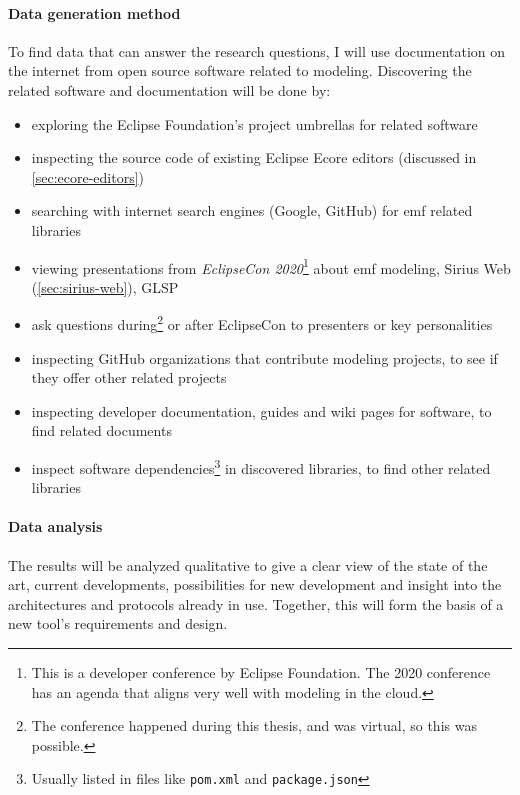 \paragraph*{Data generation method}
To find data that can answer the research questions, I will use documentation on the internet from \gls{open source} software related to modeling.
Discovering the related software and documentation will be done by:
\begin{itemize}
  \item exploring the Eclipse Foundation's project umbrellas for related software
  \item inspecting the source code of existing \gls{Eclipse} \gls{Ecore} editors (discussed in \cref{sec:ecore-editors})
  \item searching with internet search engines (Google, GitHub) for \gls{emf} related libraries
  \item viewing presentations from \emph{EclipseCon 2020}\footnote{This is a developer conference by Eclipse Foundation. The 2020 conference has an agenda that aligns very well with modeling in the \gls{cloud}.} about \gls{emf} modeling, Sirius Web (\cref{sec:sirius-web}), \acrshort{GLSP}
  \item ask questions during\footnote{The conference happened during this thesis, and was virtual, so this was possible.} or after EclipseCon to presenters or key personalities 
  \item inspecting GitHub organizations that contribute modeling projects, to see if they offer other related projects
  \item inspecting developer documentation, guides and wiki pages for software, to find related documents
  \item inspect software dependencies\footnote{Usually listed in files like \texttt{pom.xml} and \texttt{package.json}} in discovered libraries, to find other related libraries 
\end{itemize}

\paragraph*{Data analysis}
The results will be analyzed qualitative to give a clear view of the state of the art, current developments, possibilities for new development and insight into the architectures and protocols already in use.
Together, this will form the basis of a new tool's requirements and design.






